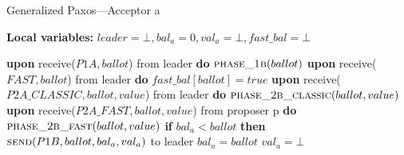 \documentclass[algorithms,article,accept,moreauthors,pdftex,10pt,a4paper]{Definitions/mdpi}
\begin{document}
\begin{algorithm}[H] 
\caption{Generalized Paxos---Acceptor a}
\label{CFT-Acc}
\textbf{Local variables:} $leader = \bot, bal_a = 0,val_a = \bot,fast\_bal = \bot$
\begin{algorithmic}[1]
\State \textbf{upon} receive($P1A, ballot$) from leader \textbf{do}
\State \hspace{\algorithmicindent} $\Call{phase\_1b}{ballot}$
\State
\State \textbf{upon} receive($FAST,ballot$) from leader \textbf{do}
\State \hspace{\algorithmicindent} $fast\_bal[ballot] = true$
\State
\State \textbf{upon} receive($P2A\_CLASSIC, ballot, value$) from leader \textbf{do}
\State \hspace{\algorithmicindent} $\Call{phase\_2b\_classic}{ballot, value}$
\State 
\State \textbf{upon} receive($P2A\_FAST,ballot,value$) from proposer p \textbf{do}
\State \hspace{\algorithmicindent} $\Call{phase\_2b\_fast}{ballot, value}$
\State
{}
\State \textbf{if} $bal_a < ballot$ \textbf{then}
\State \hspace{\algorithmicindent} $\Call{send}{P1B, ballot, bal_a, val_a}$ to leader
\State \hspace{\algorithmicindent} $bal_a = ballot$
\State \hspace{\algorithmicindent} $val_a = \bot$


\end{algorithmic}
\end{algorithm}
\end{document}
